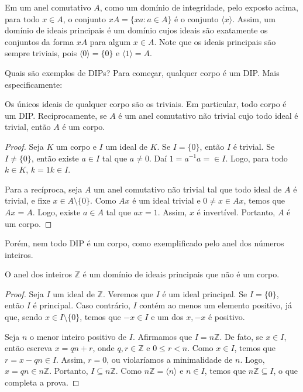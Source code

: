 Em um anel comutativo $A$, como um domínio de integridade, pelo exposto acima, para todo $x \in A$, o conjunto $xA=\{xa: a \in A\}$ é o conjunto $\langle x\rangle$.
Assim, um domínio de ideais principais é um domínio cujos ideais são exatamente os conjuntos da forma $xA$ para algum $x \in A$. Note que os ideais principais são sempre triviais, pois $\langle 0\rangle=\{0\}$ e $\langle 1\rangle = A$.

Quais são exemplos de DIPs? Para começar, qualquer corpo é um DIP. Mais especificamente:

\begin{prop}
    Os únicos ideais de qualquer corpo são os triviais.
    Em particular, todo corpo é um DIP.
    Reciprocamente, se $A$ é um anel comutativo não trivial cujo todo ideal é trivial, então $A$ é um corpo.
\end{prop}
\begin{proof}
    Seja $K$ um corpo e $I$ um ideal de $K$.
    Se $I=\{0\}$, então $I$ é trivial.
    Se $I\neq \{0\}$, então existe $a \in I$ tal que $a \neq 0$. Daí $1=a^{-1}a=\in I$.
    Logo, para todo $k \in K$, $k=1k\in I$.

    Para a recíproca, seja $A$ um anel comutativo não trivial tal que todo ideal de $A$ é trivial, e fixe $x \in A\setminus \{0\}$.
    Como $Ax$ é um ideal trivial e $0\neq x \in Ax$, temos que $Ax=A$.
    Logo, existe $a \in A$ tal que $ax=1$. Assim, $x$ é invertível.
    Portanto, $A$ é um corpo.
\end{proof}

Porém, nem todo DIP é um corpo, como exemplificado pelo anel dos números inteiros.

\begin{prop} O anel dos inteiros $\mathbb Z$ é um domínio de ideais principais que não é um corpo.
\end{prop}
\begin{proof}
    Seja $I$ um ideal de $\mathbb Z$.
    Veremos que $I$ é um ideal principal.
    Se $I=\{0\}$, então $I$ é principal.
    Caso contrário, $I$ contém ao menos um elemento positivo, já que, sendo $x\in I\setminus\{0\}$, temos que $-x \in I$ e um dos $x, -x$ é positivo.

    Seja $n$ o menor inteiro positivo de $I$.
    Afirmamos que $I=n\mathbb Z$.
    De fato, se $x \in I$, então escreva $x=qn+r$, onde $q,r \in \mathbb Z$ e $0\leq r<n$.
    Como $x \in I$, temos que $r=x-qn \in I$. Assim, $r=0$, ou violaríamos a minimalidade de $n$.
    Logo, $x=qn\in n\mathbb Z$.
    Portanto, $I\subseteq n\mathbb Z$.
    Como $n\mathbb Z=\langle n\rangle$ e $n \in I$, temos que $n\mathbb Z\subseteq I$, o que completa a prova.
\end{proof}

